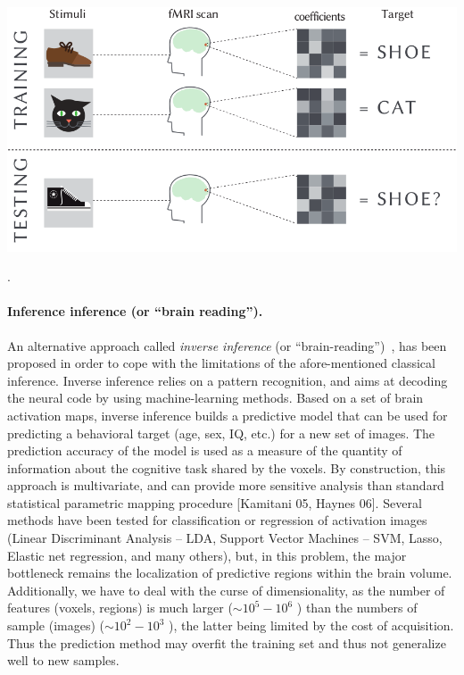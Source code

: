 \begin{pagefigure}
  \includegraphics[width=1\linewidth]{figures/decoding.png}
  \caption{\textbf{Decoding} models mine
patterns of activity to discriminate
between cognitive states~\citep{dehaene1998}. Different
activation patterns reflect different mental states. For example,
those associated with different images viewed by the subject.
In a training phase, the classifier will
learn to discriminate between brain activity measured under different
cognitive states. In the testing phase the generalization performance of the trained model is
quantified by evaluating the classifier on the testing set and comparing
the output of the classifier with the true labels associated with
the stimuli. %
Adapted from ~\citep{pedregosa2015feature}}.
\end{pagefigure}

\paragraph{Inference inference (or ``brain reading'').}
An alternative approach called \textit{inverse inference} (or ``brain-reading'')~\citep{dehaene1998,cox2003}, has been proposed in order to cope with the limitations of the afore-mentioned classical inference. Inverse inference relies on a pattern recognition, and aims at decoding the neural code by using machine-learning methods. Based on a set of brain activation maps, inverse inference builds a predictive model that can be used for predicting a behavioral target (age, sex, IQ, etc.) for a new set of images. The prediction accuracy of the model is used as a measure of the quantity of information about the cognitive task shared by the voxels. By construction, this approach is multivariate, and can provide more sensitive analysis than standard statistical parametric mapping procedure [Kamitani 05, Haynes 06]. Several methods have been tested for classification or regression of activation images (Linear Discriminant Analysis -- LDA, Support Vector Machines -- SVM, Lasso, Elastic net regression, and many others), but, in this problem, the major bottleneck remains the localization of predictive regions within the brain volume. Additionally, we have to deal with the curse of dimensionality, as the number of features (voxels, regions) is much larger ($\sim 10^5-10^6$ ) than the numbers of sample (images) ($\sim 10^2 - 10^3$ ), the latter being limited by the cost of acquisition. Thus the prediction method may overfit the training set and thus not generalize well to new samples.

